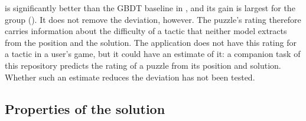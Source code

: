 \documentclass[11pt]{article}
\begin{document}
 is significantly better than the GBDT baseline in
, and its gain is largest for the group
(). It does not remove the deviation,
however. The puzzle's rating therefore carries information about the
difficulty of a tactic that neither model extracts from the position and the
solution. The application does not have this rating for a tactic in a user's
game, but it could have an estimate of it: a companion task of this
repository predicts the rating of a puzzle from its position and solution.
Whether such an estimate reduces the deviation has not been tested.

\subsection{Properties of the solution}
\end{document}
